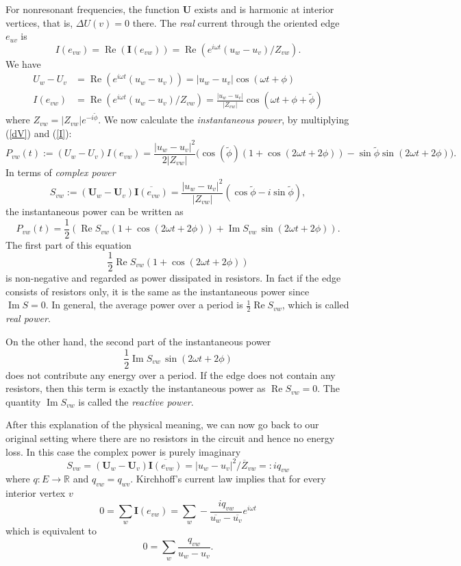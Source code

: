 \documentclass[12pt]{amsart}
\DeclareMathOperator{\Real}{Re}
\DeclareMathOperator{\Imaginary}{Im}
\renewcommand{\Re}{\Real}
\renewcommand{\Im}{\Imaginary}
\newcommand{\U}{\mathbf U}
\begin{document}
For nonresonant frequencies, the function $\U$ exists and is harmonic at interior vertices, that is, $\Delta U(v)=0$ there. 
The \emph{real} current through the oriented edge $e_{uv}$ is
\[
I(e_{vw})= \Re(\mathbf{I}(e_{vw})) = \Re(e^{i \omega t} (u_w - u_v)/ Z_{vw}).  
\]
We have
\begin{align}
U_w - U_v &= \Re(e^{i \omega t} (u_w - u_v)) = |u_w-u_v| \cos(\omega t + \phi) \label{dV}\\
I(e_{vw}) &= \Re(e^{i \omega t} (u_w - u_v)/Z_{vw}) = \frac{|u_w-u_v|}{|Z_{vw}|} \cos(\omega t + \phi+\tilde{\phi})\label{I}
\end{align}
where $Z_{vw} = |Z_{vw}|e^{-i\tilde{\phi}}$. 
We now calculate the \emph{instantaneous power}, by multiplying (\ref{dV}) and (\ref{I}):
\[
P_{vw}(t) := (U_w - U_v) I(e_{vw}) = \frac{|u_w - u_v|^2}{2|Z_{vw}|}\Big( \cos(\tilde{\phi}) (1 + \cos(2\omega t + 2\phi)) - \sin \tilde{\phi} \sin(2 \omega t + 2\phi)\Big).
\]
In terms of \emph{complex power} 
\[
S_{vw}:= (\U_w - \U_v) \overline{\mathbf{I}(e_{vw})}= \frac{|u_w-u_v|^2}{|Z_{vw}|} (\cos \tilde{\phi} - i \sin \tilde{\phi}),
\]
the instantaneous power can be written as
\[
P_{vw}(t) =  \frac{1}{2}( \Re S_{vw} (1 + \cos(2\omega t + 2\phi)) + \Im S_{vw} \, \sin(2\omega t + 2\phi)).
\]
The first part of this equation 
\[
\frac{1}{2} \Re S_{vw} (1 + \cos(2\omega t + 2\phi))
\]
is non-negative and regarded as power dissipated in resistors. In fact if the edge consists of resistors only, it is the same as the instantaneous power since $\Im S =0$. In general, the average power over a period is $\frac12\Re S_{vw}$, which is called \emph{real power}.

On the other hand, the second part of the instantaneous power
\[
\frac{1}{2} \Im S_{vw} \, \sin(2\omega t + 2\phi)
\]
does not contribute any energy over a period. If the edge does not contain any resistors, then this term is exactly the instantaneous power as $\Re S_{vw}=0$. The quantity $\Im S_{vw}$ is called the \emph{reactive power}.

After this explanation of the physical meaning, we can now go back to our original setting where there are no resistors in the circuit and hence no energy loss. In this case the complex power is purely imaginary
\[
S_{vw} = (\U_w - \U_v) \overline{\mathbf{I}(e_{vw})} = |u_w - u_v|^2 / \overline{Z}_{vw} =: iq_{vw}
\]
where $q:E \to \mathbb{R}$ and $q_{vw} = q_{wv}$. Kirchhoff's current law implies that for every interior vertex $v$
\[
0 = \sum_w \mathbf{I}(e_{vw}) = \sum_w -\frac{iq_{vw}}{ \overline{u_w} - \overline{u_v}} e^{i\omega t} 
\]
which is equivalent to
\[
0 = \sum_w \frac{q_{vw}}{u_w - u_v}.
\]
\end{document}
